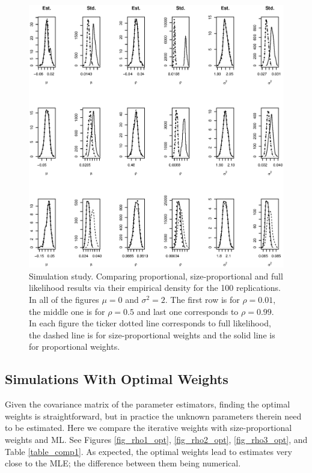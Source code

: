 \documentclass[11pt,a5paper,twoside]{book}
\begin{document}
{\begin{figure}[ht!]
\includegraphics[angle=270]{comp_rho2.eps}
\caption[Simulation study. Comparing proportional, size-proportional and full likelihood results via their empirical density for the 100 replications]{Simulation study. Comparing proportional, size-proportional and full likelihood results via their empirical density for the 100 replications. In all of the figures $\mu=0$ and $\sigma^2=2$. The first row is for $\rho=0.01$, the middle one is for $\rho=0.5$ and last one corresponds to $\rho=0.99$. In each figure the ticker dotted line corresponds to full likelihood, the dashed line is for size-proportional weights and the solid line is for proportional weights.} \label{fig_rho2b}
\end{figure}


\subsection{Simulations With Optimal Weights}

Given the  covariance matrix of the parameter estimators, finding the optimal weights is straightforward, but in practice the unknown parameters therein need to be estimated.  Here we compare the iterative weights with size-proportional weights and ML. See Figures \ref{fig_rho1_opt}, \ref{fig_rho2_opt}, \ref{fig_rho3_opt}, and Table \ref{table_comp1}.
As expected, the optimal weights lead to estimates very close to the MLE; the difference between them being numerical. 

}
\end{document}
